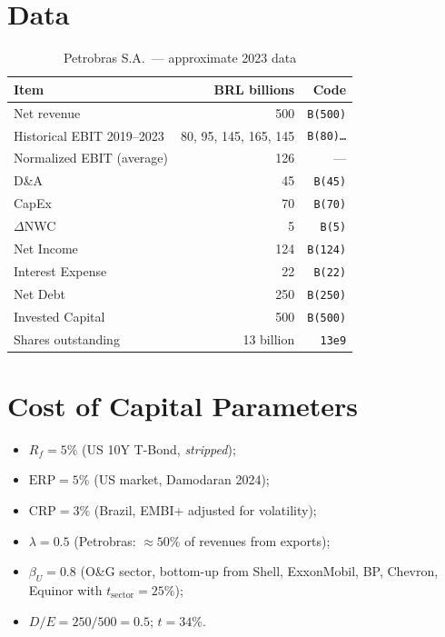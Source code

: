 \documentclass[12pt, a4paper, oneside]{book}
\newcommand{\ERP}{\ensuremath{\mathrm{ERP}}}
\newcommand{\CRP}{\ensuremath{\mathrm{CRP}}}
\newcommand{\Rf}{R_f}
\begin{document}
\section{Data}

\begin{table}[h]
\centering
\caption{Petrobras S.A.\ --- approximate 2023 data}
\begin{tabularx}{\textwidth}{Xrr}
\toprule
\textbf{Item} & \textbf{BRL billions} & \textbf{Code} \\
\midrule
Net revenue & 500 & \texttt{B(500)} \\
Historical EBIT 2019--2023 & 80, 95, 145, 165, 145 & \texttt{B(80)\ldots} \\
Normalized EBIT (average) & 126 & --- \\
D\&A & 45 & \texttt{B(45)} \\
CapEx & 70 & \texttt{B(70)} \\
$\Delta$NWC & 5 & \texttt{B(5)} \\
Net Income & 124 & \texttt{B(124)} \\
Interest Expense & 22 & \texttt{B(22)} \\
Net Debt & 250 & \texttt{B(250)} \\
Invested Capital & 500 & \texttt{B(500)} \\
Shares outstanding & 13 billion & \texttt{13e9} \\
\bottomrule
\end{tabularx}
\end{table}

\section{Cost of Capital Parameters}

\begin{itemize}
  \item $\Rf = 5\%$ (US 10Y T-Bond, \emph{stripped});
  \item $\ERP = 5\%$ (US market, Damodaran 2024);
  \item $\CRP = 3\%$ (Brazil, EMBI+ adjusted for volatility);
  \item $\lambda = 0.5$ (Petrobras: $\approx 50\%$ of revenues from exports);
  \item $\beta_U = 0.8$ (O\&G sector, bottom-up from Shell, ExxonMobil,
        BP, Chevron, Equinor with $t_{\text{sector}} = 25\%$);
  \item $D/E = 250/500 = 0.5$; $t = 34\%$.
\end{itemize}
\end{document}

